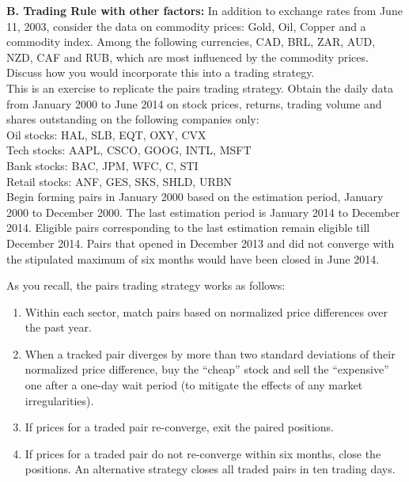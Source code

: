 \textbf{B. Trading Rule with other factors:} In addition to exchange rates from June 11, 2003, consider the data on commodity prices: Gold, Oil, Copper and a commodity index. Among the following currencies, CAD, BRL, ZAR, AUD, NZD, CAF and RUB, which are most influenced by the commodity prices. Discuss how you would incorporate this into a trading strategy. \\


\prob This is an exercise to replicate the pairs trading strategy. Obtain the daily data from January 2000 to June 2014 on stock prices, returns, trading volume and shares outstanding on the following companies only: \\

\indent Oil stocks: HAL, SLB, EQT, OXY, CVX \\

\indent Tech stocks: AAPL, CSCO, GOOG, INTL, MSFT \\

\indent Bank stocks: BAC, JPM, WFC, C, STI \\

\indent Retail stocks: ANF, GES, SKS, SHLD, URBN \\

Begin forming pairs in January 2000 based on the estimation period, January 2000 to December 2000. The last estimation period is January 2014 to December 2014. Eligible pairs corresponding to the last estimation remain eligible till December 2014. Pairs that opened in December 2013 and did not converge with the stipulated maximum of six months would have been closed in June 2014.


As you recall, the pairs trading strategy works as follows:
	\begin{enumerate}[--]
	\item Within each sector, match pairs based on normalized price differences over the past year.
	\item When a tracked pair diverges by more than two standard deviations of their normalized price difference, buy the ``cheap'' stock and sell the ``expensive'' one after a one-day wait period (to mitigate the effects of any market irregularities).
	\item If prices for a traded pair re-converge, exit the paired positions.
	\item If prices for a traded pair do not re-converge within six months, close the positions. An alternative strategy closes all traded pairs in ten trading days.
	\end{enumerate}

